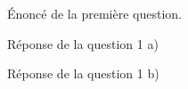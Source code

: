 
\begin{Question}
    Énoncé de la première question.   
\end{Question}

\begin{Answer}
    Réponse de la question 1 a)
\end{Answer}

\begin{Answer} 
    Réponse de la question 1 b)
\end{Answer}
